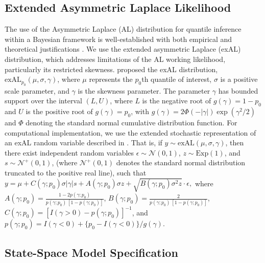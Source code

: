 \documentclass[APA,STIX1COL]{WileyNJD-v2}
\begin{document}
\subsection{Extended Asymmetric Laplace Likelihood}
\label{subsec:exal}

The use of the Asymmetric Laplace (AL) distribution for quantile inference within a Bayesian framework is well-established with both empirical and theoretical justifications \citep{yu2001bayesian, sriram2013theoretical}. We use the extended asymmetric Laplace (exAL) distribution, which addresses limitations of the AL working likelihood, particularly its restricted skewness. \citet{yan2025new} proposed the exAL distribution, $\text{exAL}_{p_0}(\mu, \sigma, \gamma)$, where $\mu$ represents the $p_0$th quantile of interest, $\sigma$ is a positive scale parameter, and $\gamma$ is the skewness parameter. The parameter $\gamma$ has bounded support over the interval $(L, U)$, where $L$ is the negative root of $g(\gamma) = 1 - p_0$ and $U$ is the positive root of $g(\gamma) = p_0$, with $g(\gamma) = 2 \Phi(-|\gamma|) \exp(\gamma^2 / 2)$ and $\Phi$ denoting the standard normal cumulative distribution function. For computational implementation, we use the extended stochastic representation of an exAL random variable described in \citet{yan2025new}. That is, if $y \sim \text{exAL}(\mu, \sigma, \gamma)$, then there exist independent random variables $\epsilon \sim \mathcal{N}(0, 1)$, $z \sim \text{Exp}(1)$, and $s \sim \mathcal{N}^+(0, 1)$, (where $\mathcal{N}^+(0, 1)$ denotes the standard normal distribution truncated to the positive real line), such that  \( y = \mu + C(\gamma; p_0)\sigma |\gamma| s + A(\gamma; p_0) \sigma z + \sqrt{B(\gamma; p_0) \sigma^2 z} \cdot \epsilon, \) where $A(\gamma; p_0) = \frac{1 - 2 p(\gamma; p_0)}{p(\gamma; p_0) \, [1 - p(\gamma; p_0)]}$, $B(\gamma; p_0) = \frac{2}{p(\gamma; p_0) \, [1 - p(\gamma; p_0)]}$, $C(\gamma; p_0) = [I(\gamma > 0) - p(\gamma; p_0)]^{-1}$, and $p(\gamma; p_0) = I(\gamma < 0) + \{p_0 - I(\gamma < 0)\} / g(\gamma)$.


\subsection{State-Space Model Specification}
\label{subsec:fullmodel}
\end{document}

